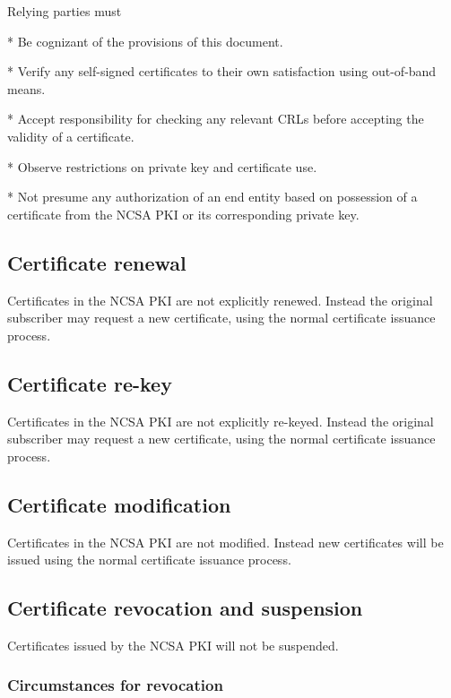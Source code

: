 \documentclass[10pt]{article}
\begin{document}
Relying parties must 

* Be cognizant of the provisions of this document. 

* Verify any self-signed certificates to their own satisfaction using
out-of-band means. 

* Accept responsibility for checking any relevant CRLs before
accepting the validity of a certificate. 

* Observe restrictions on private key and certificate use. 

* Not presume any authorization of an end entity based on possession
of a certificate from the NCSA PKI or its corresponding private key. 


\subsection{Certificate renewal}

Certificates in the NCSA PKI are not explicitly renewed. Instead the
original subscriber may request a new certificate, using the normal
certificate issuance process.

\subsection{Certificate re-key}

Certificates in the NCSA PKI are not explicitly re-keyed. Instead the
original subscriber may request a new certificate, using the normal
certificate issuance process.

\subsection{Certificate modification}

Certificates in the NCSA PKI are not modified. Instead new
certificates will be issued using the normal certificate issuance
process.

\subsection{Certificate revocation and suspension}

Certificates issued by the NCSA PKI will not be suspended.

\subsubsection{Circumstances for revocation}
\end{document}
